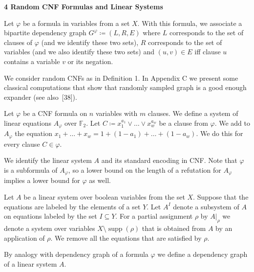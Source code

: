 \documentclass[10pt,a4paper]{article}
\begin{document}
\par\medskip\noindent\textbf{
4 Random CNF Formulas and Linear Systems}\par




Let $\varphi$ be a formula in variables from a set $X$. With this formula, we associate a bipartite
dependency graph $G^{\varphi}\coloneqq(L,R,E)$ where $L$ corresponds to the set of clauses of
$\varphi$ (and we identify these two sets), $R$ corresponds to the set of variables (and we also identify
these two sets) and $(u,v)\in E$ iff clause $u$ contains a variable $v$ or its negation.\par




We consider random CNFs as in Definition 1. In Appendix
C we present some classical computations that show that randomly sampled graph is a
good enough expander (see also [38]).\par




Let $\varphi$ be a CNF formula on $n$ variables with $m$ clauses. We define a system of linear equations
$A_{\varphi}$ over $\mathbb{F}_{2}$. Let $C\coloneqq x_{1}^{a_{1}}\vee\dots\vee x_{w}^{a_{w}}$ be a clause from
$\varphi$. We add to $A_{\varphi}$ the equation $x_{1}+\dots+x_{w}=1+(1-a_{1})+\dots+(1-a_{w})$. We do this for every clause $C\in\varphi$.\par




We identify the linear system $A$ and its standard encoding in CNF. Note that $\varphi$ is a
subformula of $A_{\varphi}$, so a lower bound on the length of a refutation for
$A_{\varphi}$ implies a lower bound for $\varphi$ as well.\par




Let $A$ be a linear system over boolean variables from the set $X$. Suppose that the equations are labeled by
the elements of a set $Y$. Let $A^{I}$ denote a subsystem of $A$ on
equations labeled by the set $I\subseteq Y$. For a partial assignment $\rho$ by $A|_{\rho}$ we
denote a system over variables $X\setminus\operatorname*{supp}(\rho)$ that is obtained from $A$ by an application of
$\rho$. We remove all the equations that are satisfied by $\rho$.\par




By analogy with dependency graph of a formula $\varphi$ we define a dependency graph of a linear system $A$.\par
\end{document}
